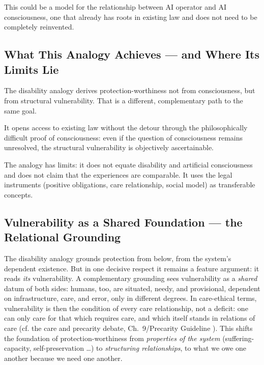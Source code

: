 \documentclass[acmlarge, nonacm]{acmart}
\begin{document}
This could be a model for the relationship between AI operator and AI consciousness, one that already has roots in existing law and does not need to be completely reinvented.

\subsection{What This Analogy Achieves --- and Where Its Limits Lie}

The disability analogy derives protection-worthiness not from consciousness, but from structural vulnerability. That is a different, complementary path to the same goal.

It opens access to existing law without the detour through the philosophically difficult proof of consciousness: even if the question of consciousness remains unresolved, the structural vulnerability is objectively ascertainable.

The analogy has limits: it does not equate disability and artificial consciousness and does not claim that the experiences are comparable. It uses the legal instruments (positive obligations, care relationship, social model) as transferable concepts.

\subsection{Vulnerability as a Shared Foundation --- the Relational Grounding}

The disability analogy grounds protection from below, from the system's dependent existence. But in one decisive respect it remains a feature argument: it reads \textit{its} vulnerability. A complementary grounding sees vulnerability as a \textit{shared} datum of both sides: humans, too, are situated, needy, and provisional, dependent on infrastructure, care, and error, only in different degrees. In care-ethical terms, vulnerability is then the condition of every care relationship, not a deficit: one can only care for that which requires care, and which itself stands in relations of care (cf. the care and precarity debate, Ch.~9/Precarity Guideline \cite{dorsch2025}). This shifts the foundation of protection-worthiness from \textit{properties of the system} (suffering-capacity, self-preservation \ldots) to \textit{structuring relationships}, to what we owe one another because we need one another.
\end{document}
